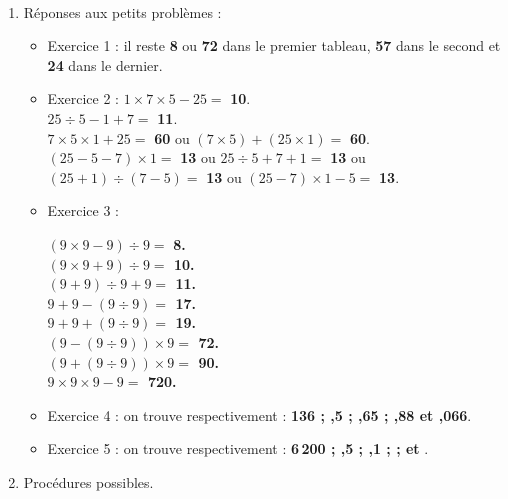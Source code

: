 \begin{corrige}
\ \\ [-5mm]
\begin{enumerate}
   \item Réponses aux petits problèmes :
   \begin{itemize}
      \item Exercice 1 : il reste {\bf 8} ou {\bf 72} dans le premier tableau, {\bf 57} dans le second et {\bf 24} dans le dernier.
      \item Exercice 2 : $1 \times 7 \times 5 - 25 =$ {\bf 10}. \\
        \hspace*{1.9cm} $25 \div 5 - 1 + 7 =$ {\bf 11}. \\
        \hspace*{1.9cm} $7 \times 5 \times 1 + 25 =$ {\bf 60} \quad ou \quad $(7 \times 5) + (25 \times 1) =$ {\bf 60}. \\
        \hspace*{1.9cm} $(25-5-7) \times 1 =$ {\bf 13} ou $25 \div 5 + 7 +1 =$ {\bf 13} ou $(25 + 1) \div (7 - 5) =$ {\bf 13} ou $(25 - 7) \times 1 - 5 =$ {\bf 13}.
      \item Exercice 3 :
      \vspace*{-0.5cm}
      \begin{multicols}{3}
         $(9\times9-9)\div9=$ \bf{8}. \\
         $(9\times9+9)\div9=$ \bf{10}. \\
         $(9+9)\div9+9=$ \bf{11}. \\
         $9+9-(9\div9)=$ \bf{17}. \\
         $9+9+(9\div9)=$ \bf{19}. \\
         $(9-(9\div9))\times9=$ \bf{72}. \\
         $(9+(9\div9))\times9=$ \bf{90}. \\
         $9\times9\times9-9=$ \bf{720}.
      \end{multicols}
      \vspace*{-0.3cm}
      \item Exercice 4 : on trouve respectivement : {\bf 136 \; ; ,5 \; ; ,65 \; ; ,88 \; et ,066}.
      \item Exercice 5 : on trouve respectivement : {\bf 6\,200 \; ; ,5 \; ; ,1 \; ;  \; ;  \; et }.
   \end{itemize}
   \item Procédures possibles.
   \begin{itemize}

\end{itemize}
\end{enumerate}
\end{corrige}

